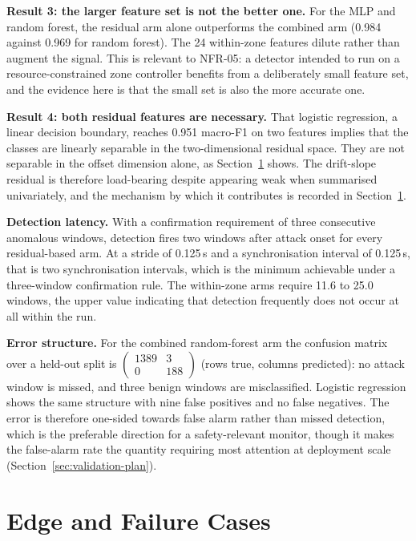 \textbf{Result 3: the larger feature set is not the better one.} For the MLP and random
forest, the residual arm alone outperforms the combined arm (0.984 against 0.969 for
random forest). The 24 within-zone features dilute rather than augment the signal. This
is relevant to NFR-05: a detector intended to run on a resource-constrained zone
controller benefits from a deliberately small feature set, and the evidence here is that
the small set is also the more accurate one.

\textbf{Result 4: both residual features are necessary.} That logistic regression, a
linear decision boundary, reaches 0.951 macro-F1 on two features implies that the
classes are linearly separable in the two-dimensional residual space. They are not
separable in the offset dimension alone, as Section~\ref{sec:edge-cases} shows. The drift-slope residual
is therefore load-bearing despite appearing weak when summarised univariately, and the
mechanism by which it contributes is recorded in Section~\ref{sec:edge-cases}.

\textbf{Detection latency.} With a confirmation requirement of three consecutive
anomalous windows, detection fires two windows after attack onset for every
residual-based arm. At a stride of 0.125\,s and a synchronisation interval of
0.125\,s, that is two synchronisation intervals, which is the minimum achievable under
a three-window confirmation rule. The within-zone arms require 11.6 to 25.0 windows,
the upper value indicating that detection frequently does not occur at all within the
run.

\textbf{Error structure.} For the combined random-forest arm the confusion matrix over
a held-out split is $\left(\begin{smallmatrix}1389 & 3\\ 0 & 188\end{smallmatrix}\right)$
(rows true, columns predicted): no attack window is missed, and three benign windows
are misclassified. Logistic regression shows the same structure with nine false
positives and no false negatives. The error is therefore one-sided towards false alarm
rather than missed detection, which is the preferable direction for a safety-relevant
monitor, though it makes the false-alarm rate the quantity requiring most attention at
deployment scale (Section~\ref{sec:validation-plan}).

\section{Edge and Failure Cases}
\label{sec:edge-cases}

